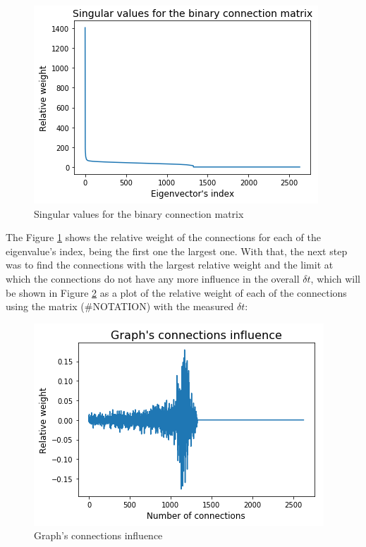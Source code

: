 \documentclass[12pt,a4paper,english]{article}
\begin{document}
\begin{figure}[ht]
  \begin{center}   
   \includegraphics[width=\textwidth]{singular_values.png}
  \end{center}
  \caption{Singular values for the binary connection matrix}\label{fig:sing_va}
\end{figure}

The Figure \ref{fig:sing_va} shows the relative weight of the connections for each of the eigenvalue's index, being the first one the largest one. With that, the next step was to find the connections with the largest relative weight and the limit at which the connections do not have any more influence in the overall $\delta t$, which will be shown in Figure \ref{fig:influence} as a plot of the relative weight of each of the connections using the matrix (#NOTATION) with the measured $\delta t$:

\begin{figure}[ht]
  \begin{center}   
   \includegraphics[width=\textwidth]{connections_influence.png}
  \end{center}
  \caption{Graph's connections influence}\label{fig:influence}
\end{figure}
\end{document}
